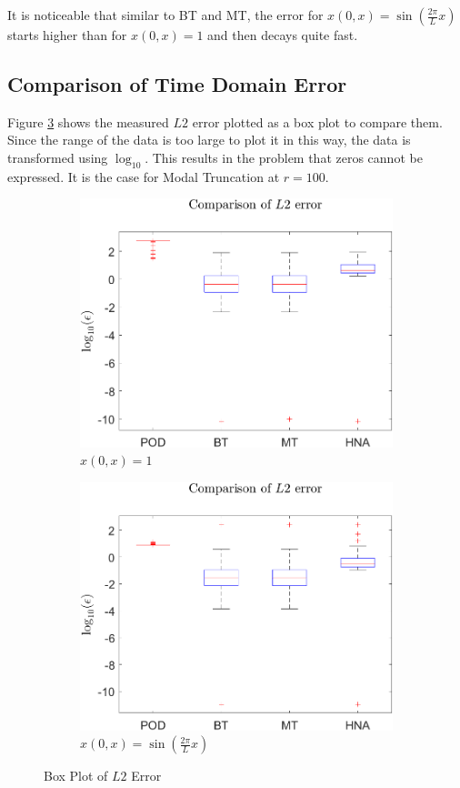 It is noticeable that similar to BT and MT, the error for \(x(0, x) = \sin(\frac{2\pi}{L}x)\) starts higher than for \(x(0, x) = 1\) and then decays quite fast.

\subsection{Comparison of Time Domain Error}
Figure \ref{FIG-BOX-L2} shows the measured \(L2\) error plotted as a box plot to compare them. 
Since the range of the data is too large to plot it in this way, the data is transformed using \(\log_{10}\).
This results in the problem that zeros cannot be expressed.
It is the case for Modal Truncation at \(r = 100\).
\begin{figure}[H]
\begin{subfigure}[b]{0.5\textwidth}
\centering
\includegraphics[width=\textwidth]{images/L2_BOX}
\caption{$x(0, x) = 1$}
\label{FIG-BOX}
\end{subfigure}
\begin{subfigure}[b]{0.5\textwidth}
\centering
\includegraphics[width=\textwidth]{images/L2_BOX_SIN}
\caption{$x(0, x) = \sin(\frac{2\pi}{L}x)$}
\label{FIG-BOX-SIN}
\end{subfigure}
\caption{Box Plot of \(L2\) Error}
\label{FIG-BOX-L2}
\end{figure}
